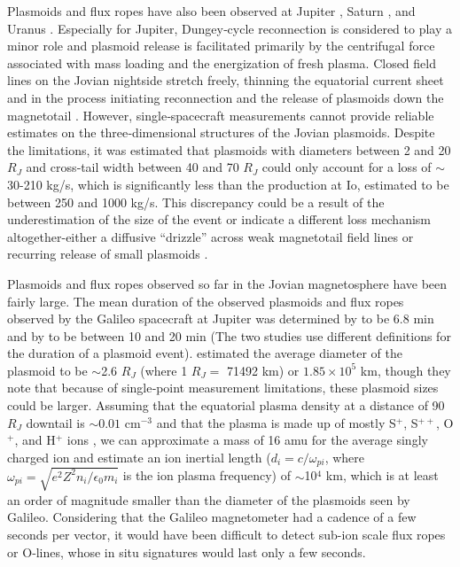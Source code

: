 Plasmoids and flux ropes have also been observed at Jupiter \cite{Kronberg2007AMagnetosphere,Kronberg2008MassParameters,Russell2000SubstormsTail,Vogt2010a,Vogt2014,Woch2002a}, Saturn \cite{Jackman2011CassiniSaturn}, and Uranus \cite{DiBraccio2019VoyagerUranus}. Especially for Jupiter, Dungey‐cycle reconnection is considered to play a minor role \cite{Cowley2008,McComas2007a} and plasmoid release is facilitated primarily by the centrifugal force associated with mass loading and the energization of fresh plasma. Closed field lines on the Jovian nightside stretch freely, thinning the equatorial current sheet and in the process initiating reconnection and the release of plasmoids down the magnetotail \cite{Cowley2015Down-tailMagnetospheres,Kivelson2005DynamicalMagnetosphere,Vasyliunas1983a}. However, single‐spacecraft measurements cannot provide reliable estimates on the three‐dimensional structures of the Jovian plasmoids. Despite the limitations, it was estimated that plasmoids with diameters between 2 and 20 $R_J$ and cross‐tail width between 40 and 70 $R_J$ \cite{Vogt2014} could only account for a loss of $\sim$30-210 kg/s, which is significantly less than the production at Io, estimated to be between 250 and 1000 kg/s. This discrepancy could be a result of the underestimation of the size of the event \cite{Cowley2015Down-tailMagnetospheres} or indicate a different loss mechanism altogether-either a diffusive ``drizzle'' across weak magnetotail field lines or recurring release of small plasmoids \cite{Bagenal2007ThePoles,Kivelson2005DynamicalMagnetosphere}.

Plasmoids and flux ropes observed so far in the Jovian magnetosphere have been fairly large. The mean duration of the observed plasmoids and flux ropes observed by the Galileo spacecraft at Jupiter was determined by \cite{Vogt2014} to be $6.8$ min and by \cite{Kronberg2008MassParameters} to be between 10 and 20 min (The two studies use different definitions for the duration of a plasmoid event). \cite{Vogt2014} estimated the average diameter of the plasmoid to be $\sim$2.6 $R_J$ (where 1 $R_J =$  71492 km) or $1.85 \times 10^5$ km, though they note that because of single‐point measurement limitations, these plasmoid sizes could be larger. Assuming that the equatorial plasma density at a distance of 90 $R_J$ downtail is $\sim0.01$ cm$^{-3}$ \cite{Bagenal2011b} and that the plasma is made up of mostly S$^{+}$, S$^{++}$, O$^{+}$, and H$^{+}$ ions \cite{Kim2020SurveyObservations}, we can approximate a mass of 16 amu for the average singly charged ion and estimate an ion inertial length ($d_i=c/\omega_{pi}$, where $\omega_{pi}=\sqrt{e^2 Z^2 n_i/\epsilon_0 m_i}$ is the ion plasma frequency) of $\sim$10$^4$ km, which is at least an order of magnitude smaller than the diameter of the plasmoids seen by Galileo. Considering that the Galileo magnetometer had a cadence of a few seconds per vector, it would have been difficult to detect sub-ion scale flux ropes or O‐lines, whose in situ signatures would last only a few seconds.

